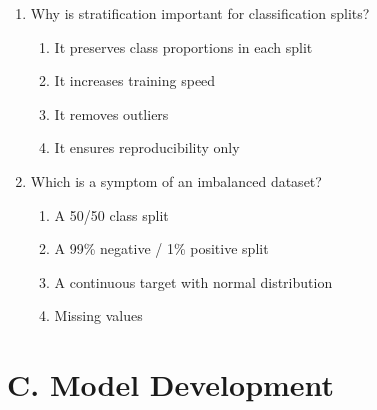 \documentclass[11pt]{article}
\begin{document}
\begin{enumerate}[leftmargin=*, label=\textbf{Q\arabic*.}, start=39]
		\item Why is stratification important for classification splits?
		\begin{enumerate}[label=(\alph*)]
			\item It preserves class proportions in each split
			\item It increases training speed
			\item It removes outliers
			\item It ensures reproducibility only
		\end{enumerate}
		
		\item Which is a symptom of an imbalanced dataset?
		\begin{enumerate}[label=(\alph*)]
			\item A 50/50 class split
			\item A 99\% negative / 1\% positive split
			\item A continuous target with normal distribution
			\item Missing values
		\end{enumerate}
		
	\end{enumerate}
	
	\newpage
	\section{C. Model Development}
	
\end{document}
